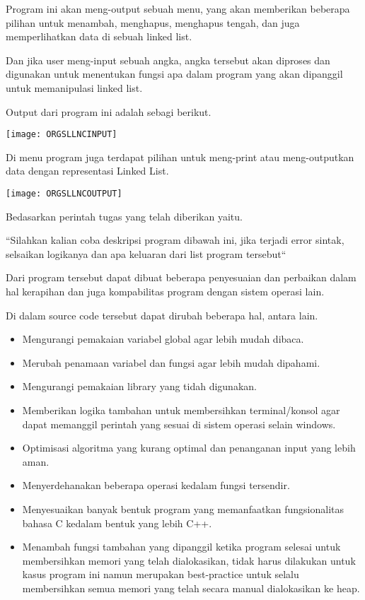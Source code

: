 \documentclass[12pt, a4paper]{article}
\begin{document}
  \newpage

  Program ini akan meng-output sebuah menu, yang akan memberikan beberapa pilihan
  untuk menambah, menghapus, menghapus tengah, dan juga memperlihatkan data di sebuah
  linked list.

  Dan jika user meng-input sebuah angka, angka tersebut akan diproses dan
  digunakan untuk menentukan fungsi apa dalam program yang akan dipanggil untuk
  memanipulasi linked list.

  Output dari program ini adalah sebagi berikut.

  \begin{center}
    \texttt{[image: ORGSLLNCINPUT]}
  \end{center}

  Di menu program juga terdapat pilihan untuk meng-print atau meng-outputkan
  data dengan representasi Linked List.

  \begin{center}
    \texttt{[image: ORGSLLNCOUTPUT]}
  \end{center}

  Bedasarkan perintah tugas yang telah diberikan yaitu.

  \begin{center}
  ``Silahkan kalian coba deskripsi program dibawah ini, jika terjadi error sintak, selsaikan logikanya dan apa keluaran dari list program tersebut``
  \end{center}

  Dari program tersebut dapat dibuat beberapa penyesuaian dan perbaikan dalam hal
  kerapihan dan juga kompabilitas program dengan sistem operasi lain.

  Di dalam source code tersebut dapat dirubah beberapa hal, antara lain.

  \begin{itemize}
    \item Mengurangi pemakaian variabel global agar lebih mudah dibaca.
    \item Merubah penamaan variabel dan fungsi agar lebih mudah dipahami.
    \item Mengurangi pemakaian library yang tidah digunakan.
    \item Memberikan logika tambahan untuk membersihkan terminal/konsol agar
      dapat memanggil perintah yang sesuai di sistem operasi selain windows.
    \item Optimisasi algoritma yang kurang optimal dan penanganan input yang lebih aman.
    \item Menyerdehanakan beberapa operasi kedalam fungsi tersendir.
    \item Menyesuaikan banyak bentuk program yang memanfaatkan fungsionalitas
      bahasa C kedalam bentuk yang lebih C++.
    \item Menambah fungsi tambahan yang dipanggil ketika program selesai untuk
      membersihkan memori yang telah dialokasikan, tidak harus dilakukan untuk
      kasus program ini namun merupakan best-practice untuk selalu membersihkan
      semua memori yang telah secara manual dialokasikan ke heap.
  \end{itemize}
\end{document}
